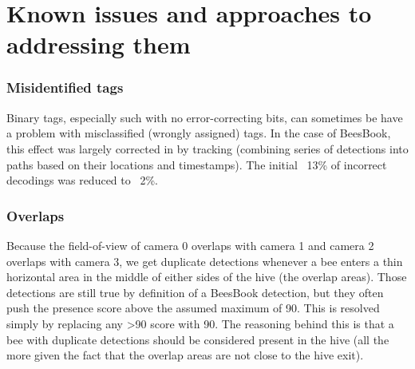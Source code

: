 


\clearpage
\section{Known issues and approaches to addressing them}

\subsubsection*{Misidentified tags} 
Binary tags, especially such with no error-correcting bits,
can sometimes be have a problem with misclassified (wrongly assigned) tags. In
the case of BeesBook, this effect was largely corrected in \cite{boenisch_tracking_2018} by tracking
(combining series of detections into paths based on their locations and
timestamps). The initial ~13\% of incorrect decodings was reduced to ~2\%. 

\subsubsection*{Overlaps}
Because the field-of-view of camera 0 overlaps with camera 1 and camera
2 overlaps with camera 3, we get duplicate detections whenever a bee enters a
thin horizontal area in the middle of either sides of the hive (the overlap
areas). Those detections are still true by definition of a BeesBook detection,
but they often push the presence score above the assumed maximum of 90. This is
resolved simply by replacing any >90 score with 90. The reasoning behind this is
that a bee with duplicate detections should be considered present in the hive
(all the more given the fact that the overlap areas are not close to the hive
exit).

